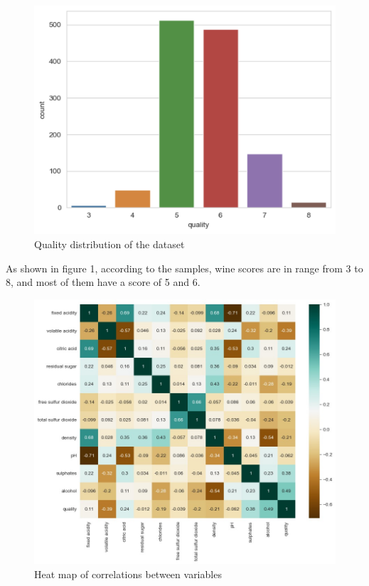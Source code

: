 \documentclass[conference]{IEEEtran}
\begin{document}
	\begin{figure}[h]
	\label{fig:foo}
	\begin{center}
	\includegraphics[scale=0.35]{quality.png}
	\caption{Quality distribution of the dataset}
	\end{center}
	\end{figure}
	
	As shown in figure 1, according to the samples, wine scores are in range from 3 to 8, and most of them have a score of 5 and 6.
	
	
	\begin{figure}
	\begin{center}
	\includegraphics[width=0.9\linewidth]{heat.jpeg}
	\caption{Heat map of correlations between variables}
	\end{center}
	\end{figure}
	
\end{document}
